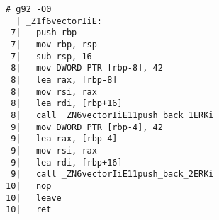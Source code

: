 \begin{lstlisting}[language={},numbers=none,title=\href{https://godbolt.org/z/9def7a}{\texttt{godbolt.org/z/9def7a}}]
# g92 -O0
  | _Z1f6vectorIiE:
 7|   push rbp
 7|   mov rbp, rsp
 7|   sub rsp, 16
 8|   mov DWORD PTR [rbp-8], 42
 8|   lea rax, [rbp-8]
 8|   mov rsi, rax
 8|   lea rdi, [rbp+16]
 8|   call _ZN6vectorIiE11push_back_1ERKi
 9|   mov DWORD PTR [rbp-4], 42
 9|   lea rax, [rbp-4]
 9|   mov rsi, rax
 9|   lea rdi, [rbp+16]
 9|   call _ZN6vectorIiE11push_back_2ERKi
10|   nop
10|   leave
10|   ret
\end{lstlisting}
